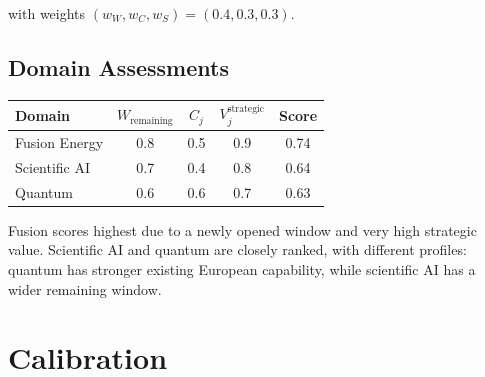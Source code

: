 \documentclass[11pt,a4paper]{article}
\theoremstyle{remark}
\begin{document}
with weights $(w_W, w_C, w_S) = (0.4, 0.3, 0.3)$.

\subsection{Domain Assessments}

\begin{center}
\begin{tabular}{lcccc}
\toprule
\textbf{Domain} & $W_{\text{remaining}}$ & $C_j$ & $V_j^{\text{strategic}}$ & \textbf{Score} \\
\midrule
Fusion Energy & 0.8 & 0.5 & 0.9 & 0.74 \\
Scientific AI & 0.7 & 0.4 & 0.8 & 0.64 \\
Quantum & 0.6 & 0.6 & 0.7 & 0.63 \\
\bottomrule
\end{tabular}
\end{center}

Fusion scores highest due to a newly opened window and very high strategic value. Scientific AI and quantum are closely ranked, with different profiles: quantum has stronger existing European capability, while scientific AI has a wider remaining window.

\section{Calibration}
\end{document}
